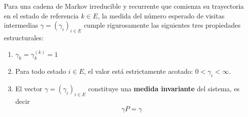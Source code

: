 \documentclass[10pt]{book}
\begin{document}
\begin{teo}
    Para una cadena de Markov irreducible y recurrente que comienza su trayectoria en el estado de referencia $k \in E$, la medida del número esperado de visitas intermedias $\gamma = (\gamma_i)_{i \in E}$ cumple rigurosamente las siguientes tres propiedades estructurales:
    \begin{enumerate}
        \item $\gamma_k = \gamma_k^{(k)} = 1$
        \item Para todo estado $i \in E$, el valor está estrictamente acotado: $0 < \gamma_i < \infty$.
        \item El vector $\gamma = (\gamma_i)_{i \in E}$ constituye una \textbf{medida invariante} del sistema, es decir
        \begin{equation*}
            \gamma P =\gamma
        \end{equation*}
    \end{enumerate}


\end{teo}
\end{document}
